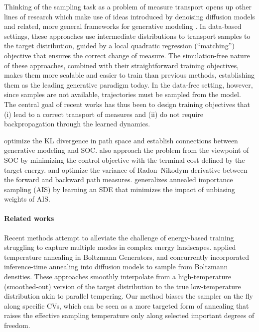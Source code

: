 \documentclass[]{fairmeta}
\theoremstyle{remark}
\begin{document}
Thinking of the sampling task as a problem of measure transport opens up other lines of research which make use of ideas introduced by
denoising diffusion models \citep{sohl2015deep,ho2020denoising} and related, more general frameworks for generative modeling \citep{lipman2022flow,albergo2023stochastic}.
In data-based settings, these approaches use intermediate distributions to transport samples to the target distribution, guided by a local quadratic regression (``matching'') objective that ensures the correct change of measure.
The simulation-free nature of these approaches, combined with their straightforward training objectives, makes them more scalable and easier to train than previous methods, establishing them as the leading generative paradigm today.
In the data-free setting, however, since samples are not available, trajectories must be sampled from the model. The central goal of recent works has thus been to design training objectives that (i) lead to a correct transport of measures and (ii) do not require backpropagation through the learned dynamics. 

\citet{vargas2023denoising,berner2022optimal} optimize the KL divergence in path space and establish connections between generative modeling and SOC.
\citet{zhang2021path,havens2025adjoint} also approach the problem from the viewpoint of SOC by minimizing the control objective with the terminal cost defined by the target energy.
\citet{richter2023improved} and \citet{vargas2023transport} optimize the variance of Radon--Nikodym derivative between the forward and backward path measures.
\citet{albergo2024nets} generalizes annealed importance sampling (AIS) by learning an SDE that minimizes the impact of unbiasing weights of AIS.

\paragraph{Related works}
Recent methods attempt to alleviate the challenge of energy-based training struggling to capture multiple modes in complex energy landscapes.
\citet{schopmans2025temperatureannealed} applied temperature annealing in Boltzmann Generators, and concurrently \citet{akhoundsadegh2025progressive,rissanen2025progressive} incorporated inference-time annealing into diffusion models to sample from Boltzmann densities.
These approaches smoothly interpolate from a high-temperature (smoothed-out) version of the target distribution to the true low-temperature distribution akin to parallel tempering.
Our method biases the sampler on the fly along specific CVs, which can be seen as a more targeted form of annealing that raises the effective sampling temperature only along selected important degrees of freedom.
\end{document}
